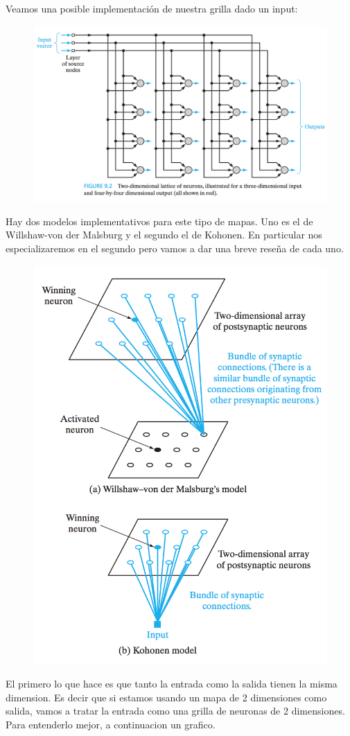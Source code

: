 Veamos una posible implementación de nuestra grilla dado un input:

\begin{figure}[h!]
  \centering
  \includegraphics[width=.6\linewidth]{img/som/implementacion}
\label{fig:test}
\end{figure}

Hay dos modelos implementativos para este tipo de mapas. Uno es el de Willshaw-von der Malsburg y el segundo el de Kohonen. En particular nos especializaremos en el segundo pero vamos a dar una breve reseña de cada uno.

\begin{figure}[h!]
  \centering
  \includegraphics[width=.6\linewidth]{img/som/modelos}
\label{fig:test}
\end{figure}


El primero lo que hace es que tanto la entrada como la salida tienen la misma dimension. Es decir que si estamos usando un mapa de 2 dimensiones como salida, vamos a tratar la entrada como una grilla de neuronas de 2 dimensiones. Para entenderlo mejor, a continuacion un grafico.


